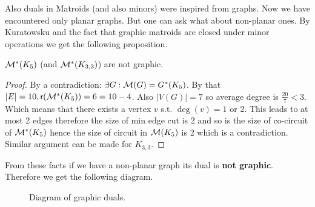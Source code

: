 Also duals in Matroids (and also minors) were inspired from graphs. Now we have encountered only planar graphs. But one can ask what about non-planar ones. By Kuratowsku and the fact that graphic matroids are closed under minor operations we get the following proposition.

\begin{prop}
	$\mathcal{M}^{\ast}(K_5)$ (and $\mathcal{M}^{\ast}(K_{3,3})$) are not graphic.
\end{prop}

\begin{proof}
	By a contradiction: $\exists G : \mathcal{M}(G) = G^{\ast}(K_5)$. By that $|E| = 10, \operatorname{\textsf{r}}(\mathcal{M}^{\ast}(K_5)) = 6 = 10 -4$. Also $|V(G)| = 7$ so average degree is $\frac{20}{7} < 3$. Which means that there exists a vertex $v$ s.t. $\deg(v) = 1$ or 2. This leads to at most 2 edges therefore the size of min edge cut is 2 and so is the size of co-circuit of $\mathcal{M}^{\ast}(K_5)$ hence the size of circuit in $\mathcal{M}(K_5)$ is 2 which is a contradiction. Similar argument can be made for $K_{3,3}$.
\end{proof}

From these facts if we have a non-planar graph its dual is \textbf{not graphic}. Therefore we get the following diagram.

\begin{figure}[!ht]\centering
	\caption{Diagram of graphic duals.}
\end{figure}